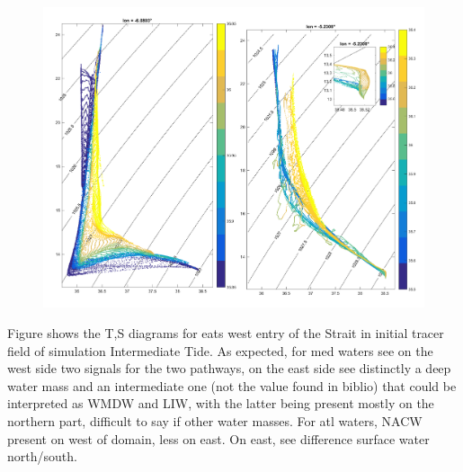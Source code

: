 \begin{figure}[!h]
        \includegraphics[width=\textwidth]{./GBR3D/WM_ini_IES.png}
        \caption{}
\end{figure}


Figure shows the T,S diagrams for eats west entry of the Strait in initial tracer field of simulation Intermediate Tide. As expected, for med waters see on the west side two signals for the two pathways, on the east side see distinctly a deep water mass and an intermediate one (not the value found in biblio) that could be interpreted as WMDW and LIW, with the latter being present mostly on the northern part, difficult to say if other water masses. For atl waters, NACW present on west of domain, less on east. On east, see difference surface water north/south.






